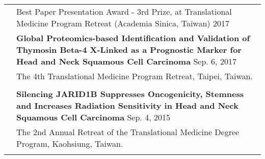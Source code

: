 \documentclass[letterpaper, 11pt]{article}
\begin{document}
\begin{longtable}{p{1.3in}p{4.8in}}
{\color{OliveGreen}{Honors and Award}} 
& Best Paper Presentation Award - 3rd Prize, at Translational Medicine
Program Retreat (Academia Sinica, Taiwan) \hfill 2017\\




 


{\color{OliveGreen}{Presentation}} 

& \textbf{Global Proteomics-based Identification
and Validation of Thymosin Beta-4 X-Linked as a Prognostic Marker for Head
and Neck Squamous Cell Carcinoma} \hfill Sep. 6, 2017 \\
& The 4th Translational Medicine
Program Retreat, Taipei, Taiwan. \\
& \\

& \textbf{Silencing JARID1B Suppresses
Oncogenicity, Stemness and Increases Radiation Sensitivity in Head and
Neck Squamous Cell Carcinoma} \hfill Sep. 4, 2015 \\
& The 2nd Annual Retreat of the
Translational Medicine Degree Program, Kaohsiung, Taiwan. \\
& \\



\end{longtable}
\end{document}
